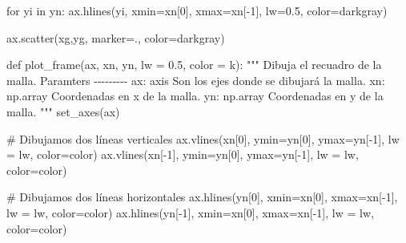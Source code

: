 \documentclass[
  letterpaper,
  DIV=11,
  numbers=noendperiod]{scrreprt}
\newenvironment{Shaded}{\begin{snugshade}}{\end{snugshade}}
\newcommand{\CommentTok}[1]{\textcolor[rgb]{0.37,0.37,0.37}{#1}}
\newcommand{\ControlFlowTok}[1]{\textcolor[rgb]{0.00,0.23,0.31}{#1}}
\newcommand{\DecValTok}[1]{\textcolor[rgb]{0.68,0.00,0.00}{#1}}
\newcommand{\FloatTok}[1]{\textcolor[rgb]{0.68,0.00,0.00}{#1}}
\newcommand{\KeywordTok}[1]{\textcolor[rgb]{0.00,0.23,0.31}{#1}}
\newcommand{\NormalTok}[1]{\textcolor[rgb]{0.00,0.23,0.31}{#1}}
\newcommand{\OperatorTok}[1]{\textcolor[rgb]{0.37,0.37,0.37}{#1}}
\newcommand{\StringTok}[1]{\textcolor[rgb]{0.13,0.47,0.30}{#1}}
\begin{document}
\begin{Shaded}
\begin{Highlighting}[]
    \ControlFlowTok{for}\NormalTok{ yi }\KeywordTok{in}\NormalTok{ yn:}
\NormalTok{        ax.hlines(yi, xmin}\OperatorTok{=}\NormalTok{xn[}\DecValTok{0}\NormalTok{], xmax}\OperatorTok{=}\NormalTok{xn[}\OperatorTok{{-}}\DecValTok{1}\NormalTok{], lw}\OperatorTok{=}\FloatTok{0.5}\NormalTok{, color}\OperatorTok{=}\StringTok{\textquotesingle{}darkgray\textquotesingle{}}\NormalTok{)}
        
\NormalTok{    ax.scatter(xg,yg, marker}\OperatorTok{=}\StringTok{\textquotesingle{}.\textquotesingle{}}\NormalTok{, color}\OperatorTok{=}\StringTok{\textquotesingle{}darkgray\textquotesingle{}}\NormalTok{)}
    
\KeywordTok{def}\NormalTok{ plot\_frame(ax, xn, yn, lw }\OperatorTok{=} \FloatTok{0.5}\NormalTok{, color }\OperatorTok{=} \StringTok{\textquotesingle{}k\textquotesingle{}}\NormalTok{):}
    \CommentTok{"""}
\CommentTok{    Dibuja el recuadro de la malla.}
\CommentTok{    }
\CommentTok{    Paramters}
\CommentTok{    {-}{-}{-}{-}{-}{-}{-}{-}{-}}
\CommentTok{    ax: axis}
\CommentTok{    Son los ejes donde se dibujará la malla.}
\CommentTok{    }
\CommentTok{    xn: np.array}
\CommentTok{    Coordenadas en x de la malla.}
\CommentTok{    }
\CommentTok{    yn: np.array}
\CommentTok{    Coordenadas en y de la malla.}
\CommentTok{    """}
\NormalTok{    set\_axes(ax)}
    
    \CommentTok{\# Dibujamos dos líneas verticales}
\NormalTok{    ax.vlines(xn[}\DecValTok{0}\NormalTok{], ymin}\OperatorTok{=}\NormalTok{yn[}\DecValTok{0}\NormalTok{], ymax}\OperatorTok{=}\NormalTok{yn[}\OperatorTok{{-}}\DecValTok{1}\NormalTok{], lw }\OperatorTok{=}\NormalTok{ lw, color}\OperatorTok{=}\NormalTok{color)}
\NormalTok{    ax.vlines(xn[}\OperatorTok{{-}}\DecValTok{1}\NormalTok{], ymin}\OperatorTok{=}\NormalTok{yn[}\DecValTok{0}\NormalTok{], ymax}\OperatorTok{=}\NormalTok{yn[}\OperatorTok{{-}}\DecValTok{1}\NormalTok{], lw }\OperatorTok{=}\NormalTok{ lw, color}\OperatorTok{=}\NormalTok{color)}

    \CommentTok{\# Dibujamos dos líneas horizontales}
\NormalTok{    ax.hlines(yn[}\DecValTok{0}\NormalTok{], xmin}\OperatorTok{=}\NormalTok{xn[}\DecValTok{0}\NormalTok{], xmax}\OperatorTok{=}\NormalTok{xn[}\OperatorTok{{-}}\DecValTok{1}\NormalTok{], lw }\OperatorTok{=}\NormalTok{ lw, color}\OperatorTok{=}\NormalTok{color)}
\NormalTok{    ax.hlines(yn[}\OperatorTok{{-}}\DecValTok{1}\NormalTok{], xmin}\OperatorTok{=}\NormalTok{xn[}\DecValTok{0}\NormalTok{], xmax}\OperatorTok{=}\NormalTok{xn[}\OperatorTok{{-}}\DecValTok{1}\NormalTok{], lw }\OperatorTok{=}\NormalTok{ lw, color}\OperatorTok{=}\NormalTok{color)}


\end{Highlighting}
\end{Shaded}
\end{document}

